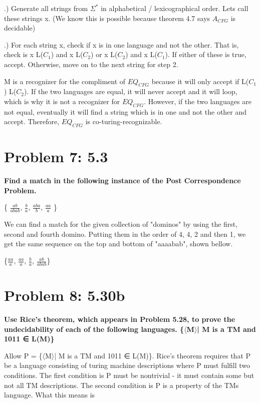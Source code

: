 \documentclass[12pt]{article}
\begin{document}
.) Generate all strings from $\Sigma^*$ in alphabetical / lexicographical order. Lets call these \indent strings x. (We know this is possible because theorem 4.7 says $A_{CFG}$ is decidable)

.) For each string x, check if x is in one language and not the other. That is, check \indent is x \in L($C_1$) and x \notin L($C_2$) or x \in L($C_2$) and x \notin L($C_1$). If either of these is true, \indent accept. Otherwise, move on to the next string for step 2.
\setlength{\parindent}{0ex}

M is a recognizer for the compliment of $EQ_{CFG}$ because it will only accept if L($C_1$) \neq L($C_2$). If the two languages are equal, it will never accept and it will loop, which is why it is not a recognizer for $EQ_{CFG}$. However, if the two languages are not equal, eventually it will find a string which is in one and not the other and accept. Therefore, $EQ_{CFG}$ is co-turing-recognizable. 


\section*{Problem 7: 5.3}
{\bfseries Find a match in the following instance of the Post Correspondence Problem.

\{ $\frac{ab}{abab}$, $\frac{b}{a}$, $\frac{aba}{b}$, $\frac{aa}{a}$ \}}


We can find a match for the given collection of "dominos" by using the first, second and fourth domino. Putting them in the order of 4, 4, 2 and then 1, we get the same sequence on the top and bottom of "aaaabab", shown bellow.

\{$\frac{aa}{a}$, $\frac{aa}{a}$, $\frac{b}{a}$, $\frac{ab}{abab}$\}



\section*{Problem 8: 5.30b}
{\bfseries Use Rice’s theorem, which appears in Problem 5.28, to prove the undecidability of each of the following languages.
\{$\langle$M$\rangle$| M is a TM and 1011 ∈ L(M)\}}

Allow P = \{$\langle$M$\rangle$| M is a TM and 1011 ∈ L(M)\}. Rice's theorem requires that P be a language consisting of turing machine descriptions where P must fulfill two conditions. The first condition is P must be nontrivial - it must contain some but not all TM descriptions. The second condition is P is a property of the TMs language. What this means is 
\end{document}
